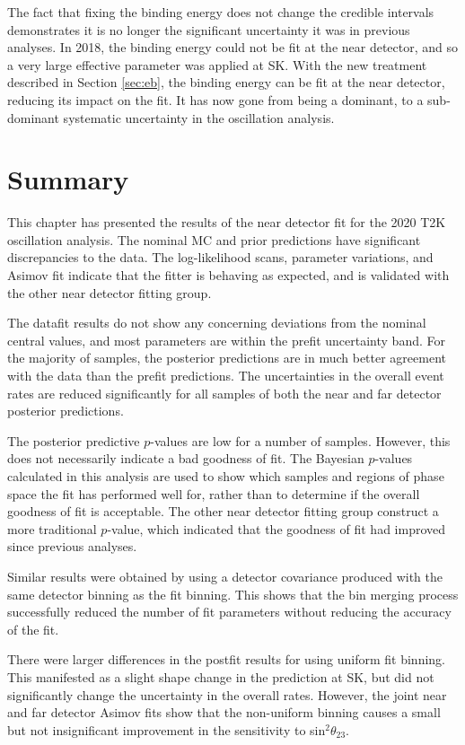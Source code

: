 The fact that fixing the binding energy does not change the credible intervals demonstrates it is no longer the significant uncertainty it was in previous analyses. In 2018, the binding energy could not be fit at the near detector, and so a very large effective parameter was applied at SK. With the new treatment described in Section \ref{sec:eb}, the binding energy can be fit at the near detector, reducing its impact on the fit. It has now gone from being a dominant, to a sub-dominant systematic uncertainty in the oscillation analysis.

\section{Summary}

This chapter has presented the results of the near detector fit for the 2020 T2K oscillation analysis. The nominal MC and prior predictions have significant discrepancies to the data. The log-likelihood scans, parameter variations, and Asimov fit indicate that the fitter is behaving as expected, and is validated with the other near detector fitting group.

The datafit results do not show any concerning deviations from the nominal central values, and most parameters are within the prefit uncertainty band. For the majority of samples, the posterior predictions are in much better agreement with the data than the prefit predictions. The uncertainties in the overall event rates are reduced significantly for all samples of both the near and far detector posterior predictions.

The posterior predictive $p$-values are low for a number of samples. However, this does not necessarily indicate a bad goodness of fit. The Bayesian $p$-values calculated in this analysis are used to show which samples and regions of phase space the fit has performed well for, rather than to determine if the overall goodness of fit is acceptable. The other near detector fitting group construct a more traditional $p$-value, which indicated that the goodness of fit had improved since previous analyses.

Similar results were obtained by using a detector covariance produced with the same detector binning as the fit binning. This shows that the bin merging process successfully reduced the number of fit parameters without reducing the accuracy of the fit. 

There were larger differences in the postfit results for using uniform fit binning. This manifested as a slight shape change in the prediction at SK, but did not significantly change the uncertainty in the overall rates. However, the joint near and far detector Asimov fits show that the non-uniform binning causes a small but not insignificant improvement in the sensitivity to sin$^2\theta_{23}$.

